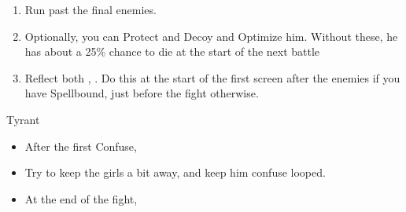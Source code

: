 \begin{gambit}
	\begin{itemize}
	\end{itemize}
\end{gambit}
\begin{enumerate}[resume]
	\item Run past the final enemies.
	\item Optionally, you can Protect and Decoy \vaan and Optimize him. Without these, he has about a 25\% chance to die at the start of the next battle
	\item Reflect both \ashe, \penelo. Do this at the start of the first screen after the enemies if you have Spellbound, just before the fight otherwise.
\end{enumerate}
\begin{battle}{Tyrant}
	\begin{itemize}
		\penelof Dispel
		\vaanf Once it's charged a bit, start spamming Confuse
		\item After the first Confuse, \GirlsGambitOn
		\item Try to keep the girls a bit away, and keep him confuse looped.
		\item At the end of the fight, \GirlsGambitOff
	\end{itemize}
\end{battle}